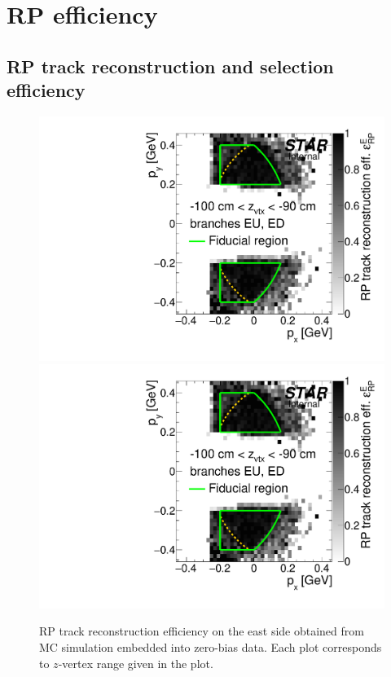 
\chapter{RP efficiency}\label{appendix:rpEff}

\section{RP track reconstruction and selection efficiency}
\begin{figure}[hb]
\caption[RP track reconstruction efficiency on the east (MC embedded into zero-bias data).]{RP track reconstruction efficiency on the east side obtained from MC simulation embedded into zero-bias data. Each plot corresponds to $z$-vertex range given in the plot.}\label{fig:rpEffE}
\centering
\parbox{0.495\textwidth}{
  \centering
  \includegraphics[width=\linewidth,page=3]{graphics/corrections/mcFullEffPxPy.pdf}\\
  \includegraphics[width=\linewidth,page=5]{graphics/corrections/mcFullEffPxPy.pdf}
}
\end{figure}
